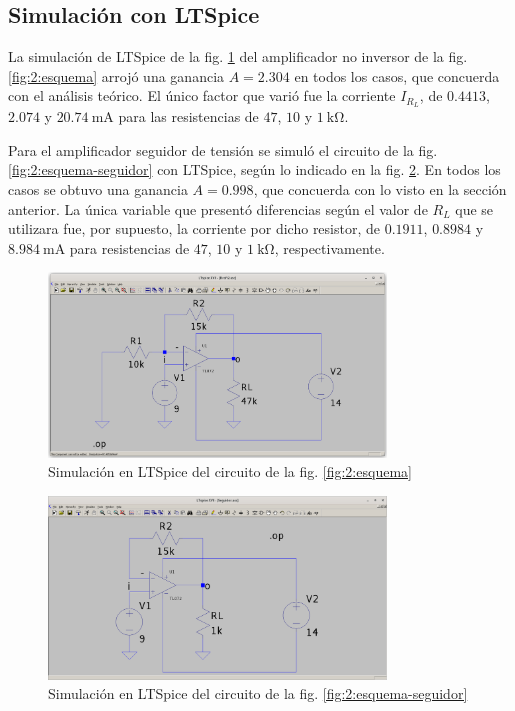 \subsection{Simulación con LTSpice}

La simulación de LTSpice de la fig. \ref{fig:2:ltspice} del amplificador no
inversor de la fig. \ref{fig:2:esquema} arrojó una ganancia $A = 2.304$ en
todos los casos, que concuerda con el análisis teórico. El único factor que
varió fue la corriente $I_{R_L}$, de $0.4413$, $2.074$ y
$\SI{20.74}{\milli\ampere}$ para las resistencias de $47$, $10$ y 
$\SI{1}{\kilo\ohm}$.

Para el amplificador seguidor de tensión se simuló el circuito de la fig.
\ref{fig:2:esquema-seguidor} con LTSpice, según lo indicado en la fig.
\ref{fig:2:ltspice-seguidor}. En todos los casos se obtuvo una ganancia $A=0.998$, que
concuerda con lo visto en la sección anterior. La única variable que presentó
diferencias según el valor de $R_L$ que se utilizara fue, por supuesto, la 
corriente por dicho resistor, de $0.1911$, $0.8984$ y
$\SI{8.984}{\milli\ampere}$ para resistencias de $47$, $10$ y
$\SI{1}{\kilo\ohm}$, respectivamente.

\begin{figure}[H]
    \centering
    \includegraphics[width=0.8\textwidth]{img/2/ltspice.png}
    \caption{Simulación en LTSpice del circuito de la fig. \ref{fig:2:esquema}}
    \label{fig:2:ltspice}
\end{figure}

\begin{figure}[H]
    \centering
    \includegraphics[width=0.8\textwidth]{img/2/ltspice-seguidor.png}
    \caption{Simulación en LTSpice del circuito de la fig.
        \ref{fig:2:esquema-seguidor}}
    \label{fig:2:ltspice-seguidor}
\end{figure}
